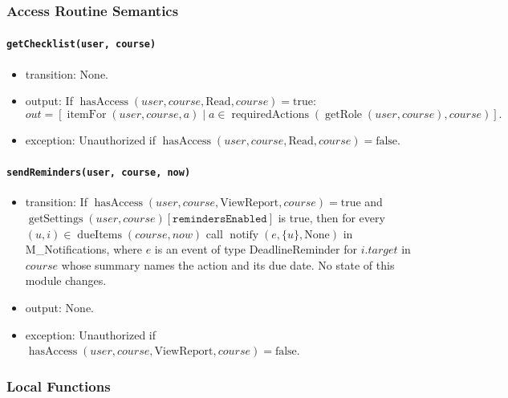 \documentclass[12pt, titlepage]{article}
\begin{document}
\subsubsection{Access Routine Semantics}

\paragraph{\texttt{getChecklist(user, course)}}
\begin{itemize}
    \item transition: None.
    \item output: If $\operatorname{hasAccess}(user,course,\text{Read},course)=\text{true}$:
    \[
        out=[\operatorname{itemFor}(user,course,a)\mid a\in\operatorname{requiredActions}(\operatorname{getRole}(user,course),course)].
    \]
    \item exception: Unauthorized if $\operatorname{hasAccess}(user,course,\text{Read},course)=\text{false}$.
\end{itemize}

\paragraph{\texttt{sendReminders(user, course, now)}}
\begin{itemize}
    \item transition: If $\operatorname{hasAccess}(user,course,\text{ViewReport},course)=\text{true}$ and
    $\operatorname{getSettings}(user,course)[\texttt{remindersEnabled}]$ is true, then for every $(u,i)\in\operatorname{dueItems}(course,now)$
    call $\operatorname{notify}(e,\{u\},\text{None})$ in M\_Notifications, where $e$ is an event of type DeadlineReminder for $i.target$ in $course$
    whose summary names the action and its due date. No state of this module changes.
    \item output: None.
    \item exception: Unauthorized if $\operatorname{hasAccess}(user,course,\text{ViewReport},course)=\text{false}$.
\end{itemize}

\subsubsection{Local Functions}
\end{document}
